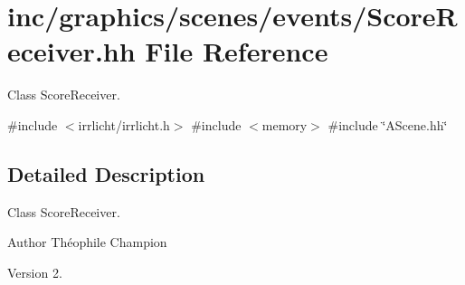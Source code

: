 \hypertarget{ScoreReceiver_8hh}{}\section{inc/graphics/scenes/events/\+Score\+Receiver.hh File Reference}
\label{ScoreReceiver_8hh}


Class Score\+Receiver.  


{\ttfamily \#include $<$irrlicht/irrlicht.\+h$>$}\newline
{\ttfamily \#include $<$memory$>$}\newline
{\ttfamily \#include \char`\"{}A\+Scene.\+hh\char`\"{}}\newline


\subsection{Detailed Description}
Class Score\+Receiver. 

\begin{DoxyAuthor}{Author}
Théophile Champion 
\end{DoxyAuthor}
\begin{DoxyVersion}{Version}
2. 
\end{DoxyVersion}
